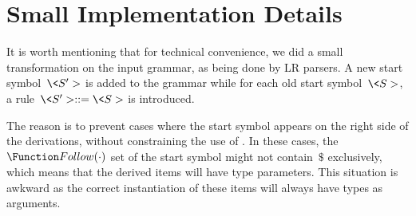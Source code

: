 \section{Small Implementation Details}
It is worth mentioning that for technical convenience, we did a small
transformation on the input grammar, as being done by LR parsers.
A new start symbol~$\<S'>$ is added to the grammar while for each old
start symbol~$\<S>$, a rule~$\<S'> ::= \<S>$ is introduced.

The reason is to prevent cases where the start symbol appears on the
right side of the derivations, without constraining the use of \Fajita.
In these cases, the $\Function Follow(\cdot)$ set of the start symbol
might not contain~$\$$ exclusively, which means that the derived items
will have type parameters. This situation is awkward as the correct instantiation
of these items will always have  types as arguments.
